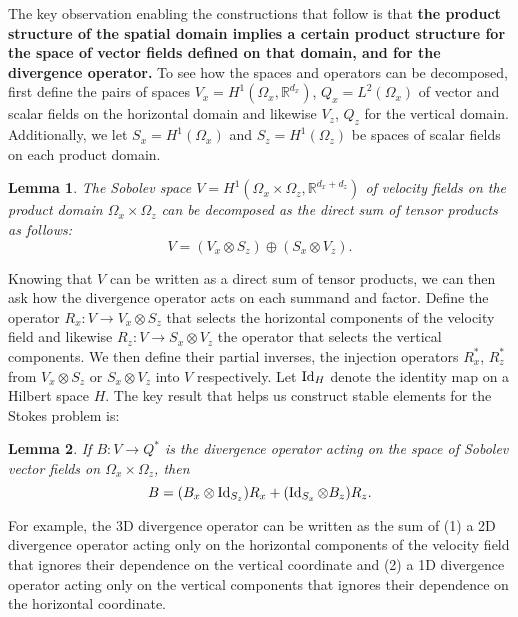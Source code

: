 \documentclass{article}
\theoremstyle{definition}
\theoremstyle{plain}
\newtheorem{lem}{Lemma}
\newcommand{\Id}[1]{\operatorname{Id} #1}
\begin{document}
The key observation enabling the constructions that follow is that \textbf{the product structure of the spatial domain implies a certain product structure for the space of vector fields defined on that domain, and for the divergence operator.}
To see how the spaces and operators can be decomposed, first define the pairs of spaces $V_x = H^1(\Omega_x, \mathbb{R}^{d_x})$, $Q_x = L^2(\Omega_x)$ of vector and scalar fields on the horizontal domain and likewise $V_z$, $Q_z$ for the vertical domain.
Additionally, we let $S_x = H^1(\Omega_x)$ and $S_z = H^1(\Omega_z)$ be spaces of scalar fields on each product domain.
\begin{lem} The Sobolev space $V = H^1(\Omega_x\times\Omega_z, \mathbb{R}^{d_x + d_z})$ of velocity fields on the product domain $\Omega_x \times \Omega_z$ can be decomposed as the direct sum of tensor products as follows:
\begin{equation}
    V = \left(V_x \otimes S_z\right) \oplus \left(S_x \otimes V_z\right).
    \label{eq:velocity-space-decomposition}
\end{equation}
\end{lem}

Knowing that $V$ can be written as a direct sum of tensor products, we can then ask how the divergence operator acts on each summand and factor.
Define the operator $R_x : V \to V_x \otimes S_z$ that selects the horizontal components of the velocity field and likewise $R_z : V \to S_x\otimes V_z$ the operator that selects the vertical components.
We then define their partial inverses, the injection operators $R_x^*$, $R_z^*$ from $V_x\otimes S_z$ or $S_x\otimes V_z$ into $V$ respectively.
Let $\Id_H$ denote the identity map on a Hilbert space $H$.
The key result that helps us construct stable elements for the Stokes problem is:
\begin{lem} If $B : V \to Q^*$ is the divergence operator acting on the space of Sobolev vector fields on $\Omega_x\times\Omega_z$, then
\begin{equation}
    B = (B_x \otimes \Id_{S_z})R_x + (\Id_{S_x}\otimes B_z)R_z.
    \label{eq:b-decomposition}
\end{equation}
\end{lem}

For example, the 3D divergence operator can be written as the sum of (1) a 2D divergence operator acting only on the horizontal components of the velocity field that ignores their dependence on the vertical coordinate and (2) a 1D divergence operator acting only on the vertical components that ignores their dependence on the horizontal coordinate.
\end{document}
